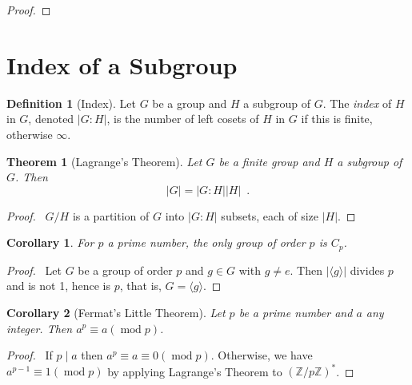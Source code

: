 \documentclass{book}
\let\qed\relax
\newtheorem{thm}[prop]{Theorem}
\newtheorem{cor}{Corollary}[prop]
\theoremstyle{definition}
\newtheorem{df}[prop]{Definition}
\renewcommand{\mod}{\ensuremath{\operatorname{mod}}}
\begin{document}
\begin{proof}
\pf
{}
\qed
\end{proof}

\section{Index of a Subgroup}

\begin{df}[Index]
Let $G$ be a group and $H$ a subgroup of $G$. The \emph{index} of $H$ in $G$, denoted $|G:H|$, is the number of left cosets of $H$ in $G$ if this is finite, otherwise $\infty$.
\end{df}

\begin{thm}[Lagrange's Theorem]
Let $G$ be a finite group and $H$ a subgroup of $G$. Then
\[ |G| = |G : H| |H| \enspace . \]
\end{thm}

\begin{proof}
\pf\ $G/H$ is a partition of $G$ into $|G:H|$ subsets, each of size $|H|$. \qed
\end{proof}

\begin{cor}
For $p$ a prime number, the only group of order $p$ is $C_p$.
\end{cor}

\begin{proof}
\pf\ Let $G$ be a group of order $p$ and $g \in G$ with $g \neq e$. Then $|\langle g \rangle|$ divides $p$ and is not 1, hence is $p$, that is, $G = \langle g \rangle$. \qed
\end{proof}

\begin{cor}[Fermat's Little Theorem]
Let $p$ be a prime number and $a$ any integer. Then $a^p \equiv a (\mod p)$.
\end{cor}

\begin{proof}
\pf\ If $p \mid a$ then $a^p \equiv a \equiv 0 (\mod p)$. Otherwise, we have $a^{p-1} \equiv 1 (\mod p)$ by applying Lagrange's Theorem to $(\mathbb{Z} / p \mathbb{Z})^*$. \qed
\end{proof}
\end{document}
